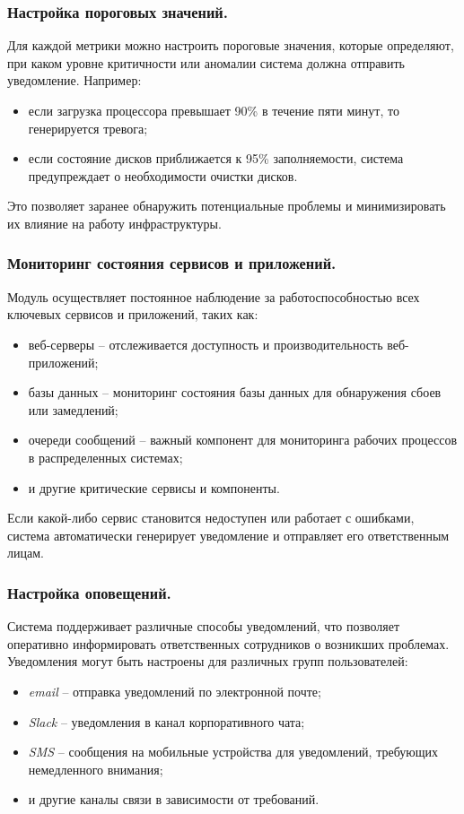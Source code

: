 \subsubsection{Настройка пороговых значений.} Для каждой метрики можно настроить пороговые значения, которые определяют, при каком уровне критичности или аномалии система должна отправить уведомление. Например:
\begin{itemize}
    \item если загрузка процессора превышает 90\% в течение пяти минут, то генерируется тревога;
    \item если состояние дисков приближается к 95\% заполняемости, система предупреждает о необходимости очистки дисков.
\end{itemize}

Это позволяет заранее обнаружить потенциальные проблемы и минимизировать их влияние на работу инфраструктуры.

\subsubsection{Мониторинг состояния сервисов и приложений.} Модуль осуществляет постоянное наблюдение за работоспособностью всех ключевых сервисов и приложений, таких как:
\begin{itemize}
    \item веб-серверы -- отслеживается доступность и производительность веб-приложений;
    \item базы данных -- мониторинг состояния базы данных для обнаружения сбоев или замедлений;
    \item очереди сообщений -- важный компонент для мониторинга рабочих процессов в распределенных системах;
    \item и другие критические сервисы и компоненты.
\end{itemize}

Если какой-либо сервис становится недоступен или работает с ошибками, система автоматически генерирует уведомление и отправляет его ответственным лицам.

\subsubsection{Настройка оповещений.} Система поддерживает различные способы уведомлений, что позволяет оперативно информировать ответственных сотрудников о возникших проблемах. Уведомления могут быть настроены для различных групп пользователей:
\begin{itemize}
    \item \textit{email} -- отправка уведомлений по электронной почте;
    \item \textit{Slack} -- уведомления в канал корпоративного чата;
    \item \textit{SMS} -- сообщения на мобильные устройства для уведомлений, требующих немедленного внимания;
    \item и другие каналы связи в зависимости от требований.
\end{itemize}

